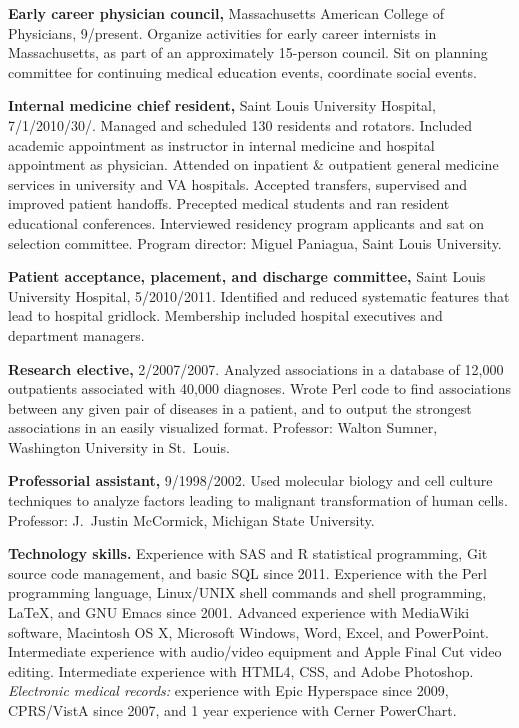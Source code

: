 \documentclass[12pt]{article}
\begin{document}
\textbf{Early career physician council,} Massachusetts American
College of Physicians,
9/\ndash{}\linebreak[0]pres\-ent. Organize activities
for early career internists in Massachusetts, as part of an
approximately 15-person council. Sit on planning committee for
continuing medical education events, coordinate social events.

\textbf{Internal medicine chief resident,} Saint Louis University
Hospital, 7/1/2010\ndash{}/30/. Managed
and scheduled
130 residents and rotators.
Included academic appointment as instructor in internal medicine and
hospital appointment as physician. Attended on inpatient \& outpatient
general medicine services in university and VA hospitals. Accepted
transfers, supervised and improved patient handoffs. Precepted medical
students and ran resident educational conferences. Interviewed residency program applicants and sat on
selection committee. Program director: Miguel Paniagua, Saint Louis
University.

\textbf{Patient acceptance, placement, and discharge committee,} Saint
Louis University Hospital, 5/2010\ndash{}/2011. Identified
and reduced systematic features that lead to hospital gridlock.
Membership included hospital executives and department managers.

\textbf{Research elective,} 2/2007/2007. Analyzed associations
in a database of 12,000 outpatients associated with 40,000 diagnoses.
Wrote Perl code to find associations between any given pair of
diseases in a patient, and to output the strongest associations in an
easily visualized format. Professor: Walton Sumner, Washington
University in St.\ Louis.

\textbf{Professorial assistant,} 9/1998/2002. Used molecular
biology and cell culture techniques to analyze factors leading to
malignant transformation of human cells. Professor: J.\ Justin
McCormick, Michigan State University.

\textbf{Technology skills.} Experience with SAS and R statistical
programming, Git source code management, and basic SQL since 2011.
Experience with the Perl programming language, Linux/UNIX shell
commands and shell programming, \LaTeX, and GNU Emacs since 2001.
Advanced experience with MediaWiki software, Macintosh OS X, Microsoft
Windows, Word, Excel, and PowerPoint. Intermediate experience with
audio/video equipment and Apple
Final Cut video editing. Intermediate experience with HTML4, CSS, and
Adobe Photoshop. \emph{Electronic medical records:} experience with
Epic Hyperspace since 2009, CPRS/VistA since 2007, and 1 year
experience with Cerner PowerChart.
\end{document}
